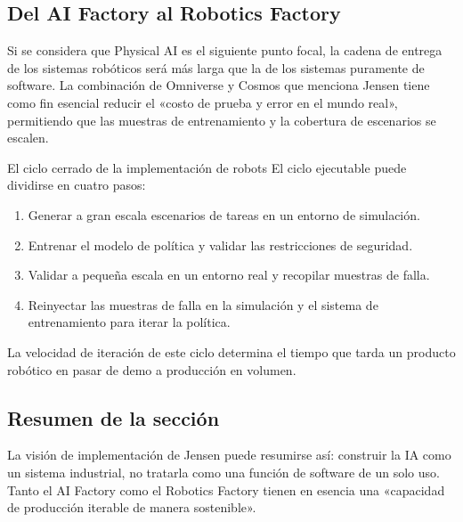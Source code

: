 \subsection{Del AI Factory al Robotics Factory}

Si se considera que Physical AI es el siguiente punto focal, la cadena de entrega de los sistemas robóticos será más larga que la de los sistemas puramente de software. La combinación de Omniverse y Cosmos que menciona Jensen tiene como fin esencial reducir el «costo de prueba y error en el mundo real», permitiendo que las muestras de entrenamiento y la cobertura de escenarios se escalen.

\begin{importantbox}{El ciclo cerrado de la implementación de robots}
El ciclo ejecutable puede dividirse en cuatro pasos:
\begin{enumerate}
    \item Generar a gran escala escenarios de tareas en un entorno de simulación.
    \item Entrenar el modelo de política y validar las restricciones de seguridad.
    \item Validar a pequeña escala en un entorno real y recopilar muestras de falla.
    \item Reinyectar las muestras de falla en la simulación y el sistema de entrenamiento para iterar la política.
\end{enumerate}
La velocidad de iteración de este ciclo determina el tiempo que tarda un producto robótico en pasar de demo a producción en volumen.
\end{importantbox}

\subsection{Resumen de la sección}
La visión de implementación de Jensen puede resumirse así: construir la IA como un sistema industrial, no tratarla como una función de software de un solo uso. Tanto el AI Factory como el Robotics Factory tienen en esencia una «capacidad de producción iterable de manera sostenible».
